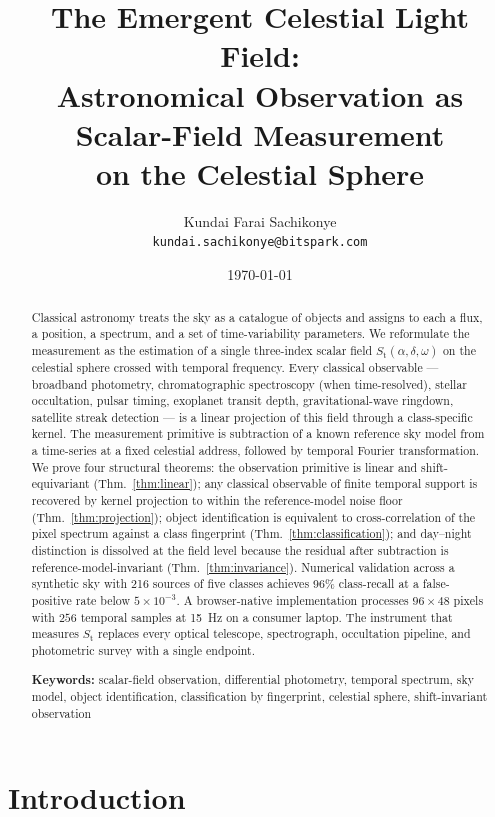\documentclass[11pt,twocolumn,a4paper]{article}
\title{\textbf{The Emergent Celestial Light Field: \\
Astronomical Observation as Scalar-Field Measurement \\
on the Celestial Sphere}}
\author{Kundai Farai Sachikonye \\
\texttt{kundai.sachikonye@bitspark.com}}
\date{\today}
\theoremstyle{definition}
\theoremstyle{remark}
\newcommand{\Sfield}{S_{\mathrm{t}}}
\newcommand{\RA}{\alpha}
\newcommand{\Dec}{\delta}
\begin{document}
\maketitle

\begin{abstract}
Classical astronomy treats the sky as a catalogue of objects and
assigns to each a flux, a position, a spectrum, and a set of
time-variability parameters. We reformulate the measurement as the
estimation of a single three-index scalar field
$\Sfield(\RA,\Dec,\omega)$ on the celestial sphere crossed with
temporal frequency. Every classical observable --- broadband
photometry, chromatographic spectroscopy (when time-resolved), stellar
occultation, pulsar timing, exoplanet transit depth, gravitational-wave
ringdown, satellite streak detection --- is a linear projection of this
field through a class-specific kernel. The measurement primitive is
subtraction of a known reference sky model from a time-series at a
fixed celestial address, followed by temporal Fourier transformation.
We prove four structural theorems: the observation primitive is linear
and shift-equivariant (Thm.~\ref{thm:linear}); any classical observable
of finite temporal support is recovered by kernel projection to within
the reference-model noise floor (Thm.~\ref{thm:projection}); object
identification is equivalent to cross-correlation of the pixel spectrum
against a class fingerprint (Thm.~\ref{thm:classification}); and
day--night distinction is dissolved at the field level because the
residual after subtraction is reference-model-invariant
(Thm.~\ref{thm:invariance}). Numerical validation across a synthetic
sky with 216 sources of five classes achieves
96\% class-recall at a false-positive rate below $5\times 10^{-3}$.
A browser-native implementation processes $96 \times 48$ pixels with
$256$ temporal samples at 15~Hz on a consumer laptop. The instrument
that measures $\Sfield$ replaces every optical telescope, spectrograph,
occultation pipeline, and photometric survey with a single endpoint.
\medskip

\noindent\textbf{Keywords:} scalar-field observation, differential
photometry, temporal spectrum, sky model, object identification,
classification by fingerprint, celestial sphere, shift-invariant
observation
\end{abstract}

\section{Introduction}
\label{sec:introduction}
\end{document}
